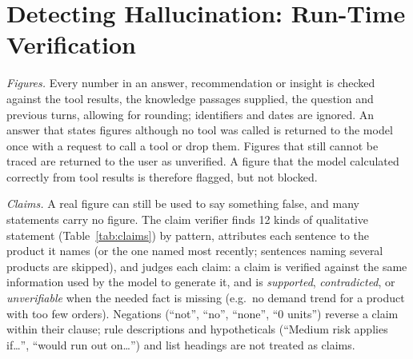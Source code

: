 \documentclass[conference]{IEEEtran}
\begin{document}
\section{Detecting Hallucination: Run-Time Verification}

\textit{Figures.} Every number in an answer, recommendation or insight is checked against the tool results,
the knowledge passages supplied, the question and previous turns, allowing for rounding; identifiers and
dates are ignored. An answer that states figures although no tool was called is returned to the model once with a
request to call a tool or drop them. Figures that still cannot be traced are returned to the user as
unverified. A figure that the model calculated correctly from tool results is therefore flagged, but not blocked.

\textit{Claims.} A real figure can still be used to say something false, and many statements carry no
figure. The claim verifier finds 12 kinds of qualitative statement (Table~\ref{tab:claims}) by pattern,
attributes each sentence to the product it names (or the one named most recently; sentences naming several
products are skipped), and judges each claim: a claim is verified against the same information used by the model to generate
it, and is \textit{supported}, \textit{contradicted}, or \textit{unverifiable} when the needed fact is missing (e.g.\ no
demand trend for a product with too few orders). Negations (``not'', ``no'', ``none'', ``0 units'') reverse a
claim within their clause; rule descriptions and hypotheticals (``Medium risk applies if\ldots'', ``would run
out on\ldots'') and list headings are not treated as claims.
\end{document}

